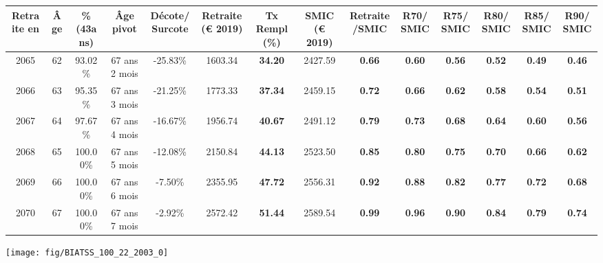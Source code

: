 \begin{adjustbox}{max width=\textwidth} 
\begin{tabular}[htb]{|c|c||c|c|c||c|c||c|c||c|c|c|c|c|} 
\hline 
 Retraite en &  Âge &  \%(43ans) &  Âge pivot &  Décote/Surcote &  Retraite (\euro{} 2019) &  Tx Rempl(\%) &  SMIC (\euro{} 2019) &  Retraite/SMIC &  R70/SMIC &  R75/SMIC &  R80/SMIC &  R85/SMIC &  R90/SMIC \\ 
\hline \hline 
 2065 &  62 &  93.02\% &  67 ans 2 mois &  -25.83\% &  1603.34 &  {\bf 34.20} &  2427.59 &  {\bf {\color{red} 0.66}} &  {\bf {\color{red} 0.60}} &  {\bf {\color{red} 0.56}} &  {\bf {\color{red} 0.52}} &  {\bf {\color{red} 0.49}} &  {\bf {\color{red} 0.46}} \\ 
\hline 
 2066 &  63 &  95.35\% &  67 ans 3 mois &  -21.25\% &  1773.33 &  {\bf 37.34} &  2459.15 &  {\bf {\color{red} 0.72}} &  {\bf {\color{red} 0.66}} &  {\bf {\color{red} 0.62}} &  {\bf {\color{red} 0.58}} &  {\bf {\color{red} 0.54}} &  {\bf {\color{red} 0.51}} \\ 
\hline 
 2067 &  64 &  97.67\% &  67 ans 4 mois &  -16.67\% &  1956.74 &  {\bf 40.67} &  2491.12 &  {\bf {\color{red} 0.79}} &  {\bf {\color{red} 0.73}} &  {\bf {\color{red} 0.68}} &  {\bf {\color{red} 0.64}} &  {\bf {\color{red} 0.60}} &  {\bf {\color{red} 0.56}} \\ 
\hline 
 2068 &  65 &  100.00\% &  67 ans 5 mois &  -12.08\% &  2150.84 &  {\bf 44.13} &  2523.50 &  {\bf {\color{red} 0.85}} &  {\bf {\color{red} 0.80}} &  {\bf {\color{red} 0.75}} &  {\bf {\color{red} 0.70}} &  {\bf {\color{red} 0.66}} &  {\bf {\color{red} 0.62}} \\ 
\hline 
 2069 &  66 &  100.00\% &  67 ans 6 mois &  -7.50\% &  2355.95 &  {\bf 47.72} &  2556.31 &  {\bf {\color{red} 0.92}} &  {\bf {\color{red} 0.88}} &  {\bf {\color{red} 0.82}} &  {\bf {\color{red} 0.77}} &  {\bf {\color{red} 0.72}} &  {\bf {\color{red} 0.68}} \\ 
\hline 
 2070 &  67 &  100.00\% &  67 ans 7 mois &  -2.92\% &  2572.42 &  {\bf 51.44} &  2589.54 &  {\bf {\color{red} 0.99}} &  {\bf {\color{red} 0.96}} &  {\bf {\color{red} 0.90}} &  {\bf {\color{red} 0.84}} &  {\bf {\color{red} 0.79}} &  {\bf {\color{red} 0.74}} \\ 
\hline 
\hline 
\end{tabular} 
\end{adjustbox} 
 
 \vspace{0.1cm} 

 {\hspace{-2.2cm}\texttt{[image: fig/BIATSS\_100\_22\_2003\_0]}} 

